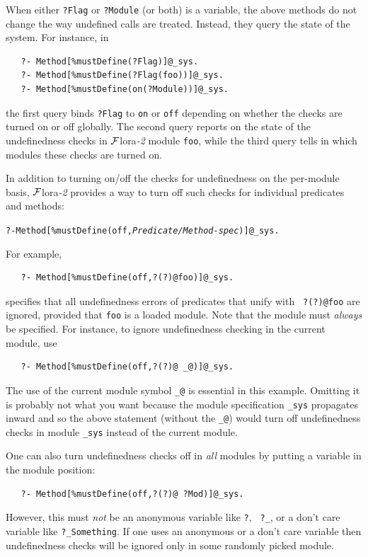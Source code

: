 \documentclass[11pt]{article}
\newcommand{\FLORA}{{\mbox{\sc ${\cal F}${lora}\rm\emph{-2}}}\xspace}
\begin{document}
When either {\tt ?Flag} or {\tt ?Module} (or both) is a variable, the above
methods do not change the way undefined calls are treated. Instead, they
query the state of the system. For instance, in
\begin{verbatim}
   ?- Method[%mustDefine(?Flag)]@_sys.
   ?- Method[%mustDefine(?Flag(foo))]@_sys.
   ?- Method[%mustDefine(on(?Module))]@_sys.
\end{verbatim}
the first query binds {\tt ?Flag} to {\tt on} or {\tt off} depending on
whether the checks are turned on or off globally. The second query reports
on the state of the undefinedness checks in \FLORA module {\tt foo}, while
the third query tells in which modules these checks are turned on.

In addition to turning on/off the checks for undefinedness on the per-module
basis, \FLORA provides a way to turn off such checks for individual
predicates and methods:
\begin{alltt}
   ?- Method[\%mustDefine(off,\mbox{\rm\emph{Predicate/Method-spec}})]@_sys.
\end{alltt}
For example, 
\begin{verbatim}
   ?- Method[%mustDefine(off,?(?)@foo)]@_sys.
\end{verbatim}
specifies that all undefinedness errors of predicates that unify with {\tt
  ?(?)@foo} are ignored, provided that {\tt foo} is a loaded module. Note
that the module must \emph{always} be specified. For instance, to ignore
undefinedness checking in the current module, use
\begin{verbatim}
   ?- Method[%mustDefine(off,?(?)@ _@)]@_sys.
\end{verbatim}
The use of the current module symbol {\tt \_@} is essential in
this example. Omitting it is probably not what you want because
the module specification {\tt \_sys} propagates inward and so the above
statement (without the {\tt \_@}) would turn off undefinedness checks in
module {\tt \_sys} instead of the current module.

One can also turn undefinedness checks off in \emph{all} modules by putting a
variable in the module position:
\begin{verbatim}
   ?- Method[%mustDefine(off,?(?)@ ?Mod)]@_sys.
\end{verbatim}
However, this must \emph{not} be an anonymous variable like {\tt ?}, {\tt
  ?\_}, or a don't care variable like {\tt ?\_Something}.  If one uses an
anonymous or a don't care variable then undefinedness checks will be ignored
only in some randomly picked module.
\end{document}
